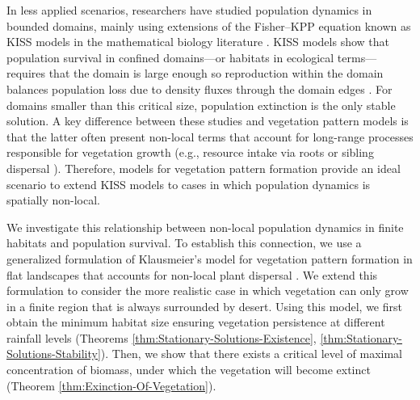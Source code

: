 \documentclass[12pt, a4paper]{article}
\theoremstyle{break}
\theoremstyle{break}
\theoremstyle{break}
\theoremstyle{break}
\theoremstyle{break}
\theoremstyle{break}
\theoremstyle{break}
\begin{document}
In less applied scenarios, researchers have studied population dynamics in bounded domains, mainly using extensions of the Fisher–KPP equation \cite{Cantrell1999,Fagan2009,Colombo2018,Dornelas2024} known as KISS models in the mathematical biology literature \cite{Skellam1951, Kierstead1953}. KISS models show that population survival in confined domains---or habitats in ecological terms--- requires that the domain is large enough so reproduction within the domain balances population loss due to density fluxes through the domain edges \cite{Cantrell2004}. For domains smaller than this critical size, population extinction is the only stable solution. A key difference between these studies and vegetation pattern models is that the latter often present non-local terms that account for long-range processes responsible for vegetation growth (e.g., resource intake via roots or sibling dispersal \cite{Martinez-Garcia2014,Eigentler2018}). Therefore, models for vegetation pattern formation provide an ideal scenario to extend KISS models to cases in which population dynamics is spatially non-local. 

We investigate this relationship between non-local population dynamics in finite habitats and population survival. To establish this connection, we use a generalized formulation of Klausmeier's model for vegetation pattern formation in flat landscapes that accounts for non-local plant dispersal \cite{Eigentler2018,Klausmeier1999}. We extend this formulation to consider the more realistic case in which vegetation can only grow in a finite region that is always surrounded by desert. Using this model, we first obtain the minimum habitat size ensuring vegetation persistence at different rainfall levels (Theorems \ref{thm:Stationary-Solutions-Existence}, \ref{thm:Stationary-Solutions-Stability}). Then, we show that there exists a critical level of maximal concentration of biomass, under which the vegetation will become extinct (Theorem \ref{thm:Exinction-Of-Vegetation}).
\end{document}

